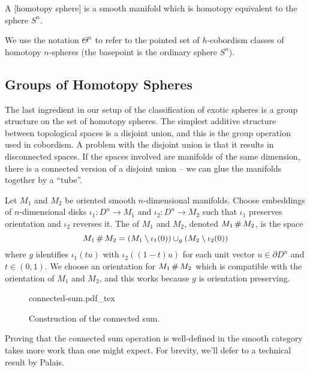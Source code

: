 \begin{definition}
	A [homotopy sphere] is a smooth manifold which is homotopy equivalent to the sphere $S^n$.
\end{definition}

\begin{definition}
	We use the notation $\Theta^n$ to refer to the pointed set of $h$-cobordism classes of homotopy $n$-spheres (the basepoint is the ordinary sphere $S^n$).
\end{definition}

\subsection{Groups of Homotopy Spheres}

The last ingredient in our setup of the classification of exotic spheres is a group structure on the set of homotopy spheres.
The simplest additive structure between topological spaces is a disjoint union, and this is the group operation used in cobordism. A problem with the disjoint union is that it results in disconnected spaces. If the spaces involved are manifolds of the same dimension, there is a connected version of a disjoint union -- we can glue the manifolds together by a ``tube''.

\begin{definition}
	Let $M_1$ and $M_2$ be oriented smooth $n$-dimensional manifolds. Choose embeddings of $n$-dimensional disks $\iota_1 : D^n \to M_1$ and $\iota_2 : D^n \to M_2$ such that $\iota_1$ preserves orientation and $\iota_2$ reverses it. The  of $M_1$ and $M_2$, denoted $M_1\,\#\, M_2$, is the space
	\[
		M_1\,\#\,M_2 = (M_1 \setminus \iota_1(0))\cup_g (M_2 \setminus \iota_2(0))
	\]
	where $g$ identifies $\iota_1(tu)$ with $\iota_2((1-t)u)$ for each unit vector $u\in \partial D^n$ and $t\in (0,1)$. We choose an orientation for $M_1\,\#\, M_2$ which is compatible with the orientation of $M_1$ and $M_2$, and this works because $g$ is orientation preserving.
\end{definition}

\begin{figure}[ht]
	\centering
	{connected-sum.pdf_tex}
	\caption{Construction of the connected sum.}\label{fig:connected-sum}
\end{figure}

Proving that the connected sum operation is well-defined in the smooth category takes more work than one might expect. For brevity, we'll defer to a technical result by Palais.

